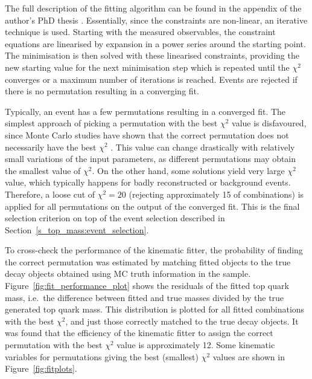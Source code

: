 
The full description of the fitting algorithm can be found in the appendix of the \HitFit author's PhD thesis
\autocite{Snyder}. Essentially, since the constraints are non-linear, an iterative technique is used. Starting with the
measured observables, the constraint equations are linearised by expansion in a power series around the starting point.
The minimisation is then solved with these linearised constraints, providing the new starting value for the next
minimisation step which is repeated until the $\chi^2$ converges or a maximum number of iterations is reached. Events
are rejected if there is no permutation resulting in a converging fit.

Typically, an event has a few permutations resulting in a converged fit. The simplest approach of picking a permutation
with the best $\chi^2$ value is disfavoured, since Monte Carlo studies have shown that the correct permutation does not
necessarily have the best $\chi^2$ \autocite{Snyder}. This value can change drastically with relatively small variations
of the input parameters, as different permutations may obtain the smallest value of $\chi^2$. On the other hand, some
solutions yield very large $\chi^2$ value, which typically happens for badly reconstructed or background events.
Therefore, a loose cut of $\chi^2=20$ (rejecting approximately \SI{15}{\pc} of combinations) is applied for all
permutations on the output of the converged fit. This is the final selection criterion on top of the event selection
described in Section~\ref{s_top_mass:event_selection}.

\pagebreak[4]
To cross-check the performance of the kinematic fitter, the probability of finding the correct permutation was estimated
by matching fitted objects to the true \ttbar decay objects obtained using MC truth information in the \ttjets sample.
Figure~\ref{fig:fit_performance_plot} shows the residuals of the fitted top quark mass, i.e.\ the difference between
fitted and true masses divided by the true generated top quark mass. This distribution is plotted for all fitted
combinations with the best $\chi^2$, and just those correctly matched to the true \ttbar decay objects. It was found
that the efficiency of the kinematic fitter to assign the correct permutation with the best $\chi^2$ value is
approximately \SI{12}{\pc}. Some kinematic variables for permutations giving the best (smallest) $\chi^2$ values are
shown in Figure~\ref{fig:fitplots}.

